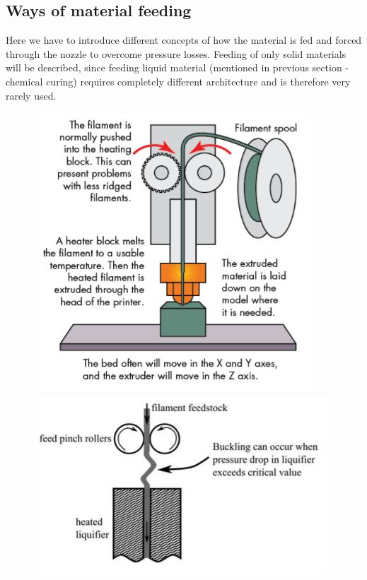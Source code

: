 \documentclass[a4paper, 11pt, reqno]{report}
\begin{document}
\subsection{Ways of material feeding}
Here we have to introduce different concepts of how the material is fed and forced through the nozzle to overcome pressure losses. Feeding of only solid materials will be described, since feeding liquid material (mentioned in previous section - chemical curing) requires completely different architecture and is therefore very rarely used.
\begin{figure}[h]
  \centering
  \begin{minipage}[b]{0.45\textwidth}
    \includegraphics[width=\textwidth]{PinchRollerMachineDesign}
  \end{minipage}
  \hfill
  \begin{minipage}[b]{0.45\textwidth}
    \includegraphics[width=\textwidth]{filamentBucklingReview}

\end{minipage}
\end{figure}
\end{document}
